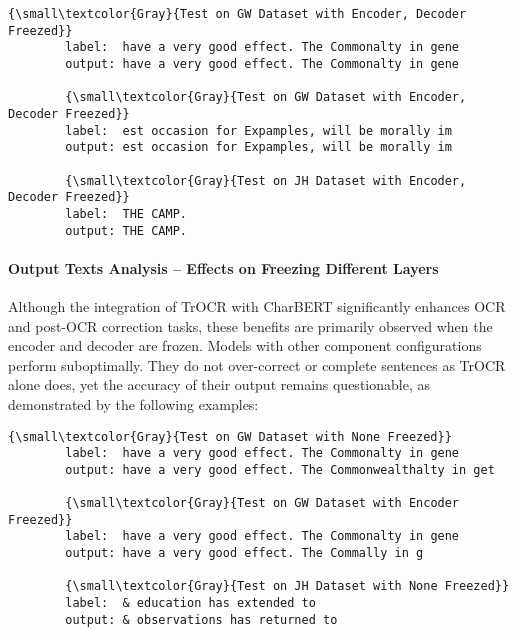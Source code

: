 \begin{center}
    \begin{minipage}{1.0\textwidth}
    \begin{Verbatim}[commandchars=\\\{\}]
        {\small\textcolor{Gray}{Test on GW Dataset with Encoder, Decoder Freezed}}
        label:  have a very good effect. The Commonalty in gene
        output: have a very good effect. The Commonalty in gene

        {\small\textcolor{Gray}{Test on GW Dataset with Encoder, Decoder Freezed}}
        label:  est occasion for Expamples, will be morally im
        output: est occasion for Expamples, will be morally im 

        {\small\textcolor{Gray}{Test on JH Dataset with Encoder, Decoder Freezed}}
        label:  THE CAMP.
        output: THE CAMP.  
    \end{Verbatim}
    \end{minipage}
\end{center}

\paragraph*{Output Texts Analysis -- Effects on Freezing Different Layers}
Although the integration of TrOCR with CharBERT significantly enhances OCR and post-OCR correction tasks, these benefits are primarily observed when the encoder and decoder are frozen. Models with other component configurations perform suboptimally. They do not over-correct or complete sentences as TrOCR alone does, yet the accuracy of their output remains questionable, as demonstrated by the following examples:

\begin{center}
    \begin{minipage}{1.0\textwidth}
    \begin{Verbatim}[commandchars=\\\{\}]
        {\small\textcolor{Gray}{Test on GW Dataset with None Freezed}}
        label:  have a very good effect. The Commonalty in gene
        output: have a very good effect. The Commonwealthalty in get

        {\small\textcolor{Gray}{Test on GW Dataset with Encoder Freezed}}
        label:  have a very good effect. The Commonalty in gene
        output: have a very good effect. The Commally in g

        {\small\textcolor{Gray}{Test on JH Dataset with None Freezed}}
        label:  & education has extended to
        output: & observations has returned to
    \end{Verbatim}
    \end{minipage}
\end{center}

